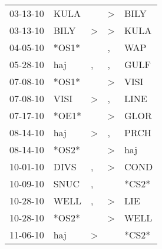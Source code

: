 \begin{supertabular}{p{0.07\textwidth}p{0.06\textwidth}p{0.02\textwidth}p{0.02\textwidth}p{0.06\textwidth}}
          03-13-10\textsuperscript{} &           KULA\textsuperscript{} &                  &     \textgreater &           BILY\textsuperscript{} \\
          03-13-10\textsuperscript{} &           BILY\textsuperscript{} &     \textgreater &     \textgreater &           KULA\textsuperscript{} \\
          04-05-10\textsuperscript{} &                            *OS1* &                  &                , &            WAP\textsuperscript{} \\
          05-28-10\textsuperscript{} &            haj\textsuperscript{} &                , &                , &           GULF\textsuperscript{} \\
          07-08-10\textsuperscript{} &                            *OS1* &                  &     \textgreater &           VISI\textsuperscript{} \\
          07-08-10\textsuperscript{} &           VISI\textsuperscript{} &     \textgreater &                , &           LINE\textsuperscript{} \\
          07-17-10\textsuperscript{} &                            *OE1* &                  &     \textgreater &           GLOR\textsuperscript{} \\
          08-14-10\textsuperscript{} &            haj\textsuperscript{} &     \textgreater &                , &           PRCH\textsuperscript{} \\
          08-14-10\textsuperscript{} &                            *OS2* &                  &     \textgreater &            haj\textsuperscript{} \\
          10-01-10\textsuperscript{} &           DIVS\textsuperscript{} &                , &     \textgreater &           COND\textsuperscript{} \\
          10-09-10\textsuperscript{} &           SNUC\textsuperscript{} &                , &                  &                            *CS2* \\
          10-28-10\textsuperscript{} &           WELL\textsuperscript{} &                , &     \textgreater &            LIE\textsuperscript{} \\
          10-28-10\textsuperscript{} &                            *OS2* &                  &     \textgreater &           WELL\textsuperscript{} \\
          11-06-10\textsuperscript{} &            haj\textsuperscript{} &     \textgreater &                  &                            *CS2* \\

\end{supertabular}
